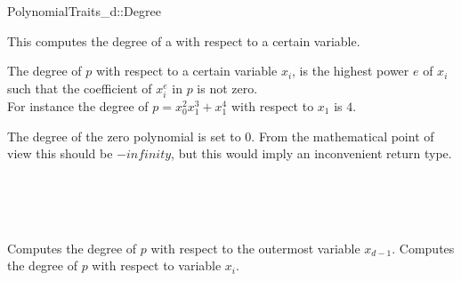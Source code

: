 \begin{ccRefConcept}{PolynomialTraits_d::Degree}

\ccDefinition

This  computes the degree 
of a  with respect to a certain variable. 

The degree of $p$ with respect to a certain variable $x_i$, 
is the highest power $e$ of $x_i$ such that the coefficient of $x_i^{e}$ in 
$p$ is not zero.\\
For instance the degree of $p = x_0^2x_1^3+x_1^4$ with respect to $x_1$ is $4$.

The degree of the zero polynomial is set to $0$. 
From the mathematical point of view this should 
be $-infinity$, but this would imply an inconvenient return type. 

 

\ccRefines 
{}\\
\\
\\


\ccTypes


\ccGlue
{}

\ccOperations
{}
         {Computes the degree of $p$ with respect to the outermost variable $x_{d-1}$.}
         {Computes the degree of $p$ with respect to variable $x_i$.
         }


\ccSeeAlso

\\
\\
\\

\end{ccRefConcept}
